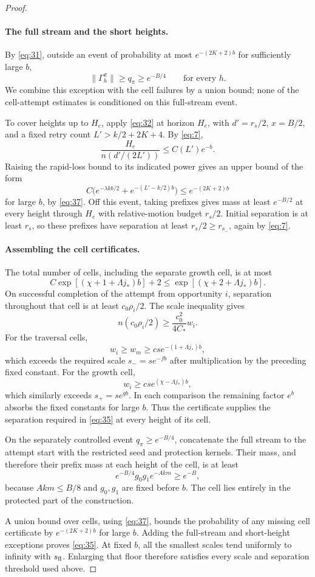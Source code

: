 \begin{proof}
\paragraph{The full stream and the short heights.}
By \eqref{eq:31}, outside an event of probability at most
\(e^{-(2K+2)b}\) for sufficiently large \(b\),
\[
 \|\Gamma_h^\pi\|\ge q_\pi\ge e^{-B/4}\qquad\text{for every }h.
\]
We combine this exception with the cell failures by a union bound; none
of the cell-attempt estimates is conditioned on this full-stream event.

To cover heights up to \(H_e\), apply \eqref{eq:32} at horizon
\(H_e\), with \(d'=r_s/2\), \(x=B/2\), and a fixed retry count
\(L'>k/2+2K+4\). By \eqref{eq:7},
\[
 \frac{H_e}{n(d'/(2L'))}\le C(L')e^{-b}.
\]
Raising the rapid-loss bound to its indicated power gives an upper bound
of the form
\[
 C\bigl(e^{-\lambda kb/2}+e^{-(L'-k/2)b}\bigr)
 \le e^{-(2K+2)b}
\]
for large \(b\), by \eqref{eq:37}. Off this event, taking prefixes
gives mass at least \(e^{-B/2}\) at every height through \(H_e\)
with relative-motion budget \(r_s/2\). Initial separation is at least
\(r_s\), so these prefixes have separation at least
\(r_s/2\ge r_{s_-}\), again by \eqref{eq:7}.

\paragraph{Assembling the cell certificates.}
The total number of cells, including the separate growth cell, is at most
\[
 C\exp[(\chi+1+\Lambda j_*)b]+2
 \le\exp[(\chi+2+\Lambda j_*)b].
\]
On successful completion of the attempt from opportunity \(i\),
separation throughout that cell is at least \(c_0\rho_i/2\). The
scale inequality gives
\[
 n(c_0\rho_i/2)\ge\frac{c_0^2}{4C_*}w_i.
\]
For the traversal cells,
\[
 w_i\ge w_m\ge cse^{-(1+\Lambda j_*)b},
\]
which exceeds the required scale \(s_-=se^{-fb}\) after multiplication
by the preceding fixed constant. For the growth cell,
\[
 w_i\ge cse^{(\chi-\Lambda j_*)b},
\]
which similarly exceeds \(s_+=se^{gb}\). In each comparison the
remaining factor \(e^b\) absorbs the fixed constants for large \(b\).
Thus the certificate supplies the separation required in
\eqref{eq:35} at every height of its cell.

On the separately controlled event \(q_\pi\ge e^{-B/4}\), concatenate
the full stream to the attempt start with the restricted seed and
protection kernels. Their mass, and therefore their prefix mass at each
height of the cell, is at least
\[
 e^{-B/4}g_0g_1e^{-Akm}\ge e^{-B},
\]
because \(Akm\le B/8\) and \(g_0,g_1\) are fixed before \(b\).
The cell lies entirely in the protected part of the construction.

A union bound over cells, using \eqref{eq:37}, bounds the probability
of any missing cell certificate by \(e^{-(2K+2)b}\) for large \(b\).
Adding the full-stream and short-height exceptions proves
\eqref{eq:35}. At fixed \(b\), all the smallest scales tend uniformly
to infinity with \(s_{\rm fl}\). Enlarging that floor therefore
satisfies every scale and separation threshold used above.
\end{proof}

